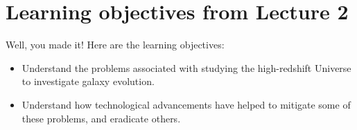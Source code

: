 \documentclass[11pt]{article}
\begin{document}
\section{Learning objectives from Lecture 2}
Well, you made it! Here are the learning objectives:
\begin{itemize}
\item Understand the problems associated with studying the
  high-redshift Universe to investigate galaxy evolution.
\item Understand how technological advancements have helped to
  mitigate some of these problems, and eradicate others.
\end{itemize}
\end{document}
